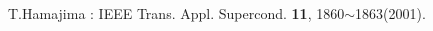 \begin{thebibliography}{9}

T.Hamajima : IEEE Trans. Appl. Supercond. {\bf 11}, 1860$\sim$1863(2001). 

\end{thebibliography}
